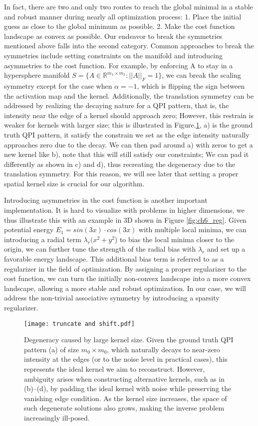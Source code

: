 In fact, there are two and only two routes to reach the global minimal in a stable and robust manner during nearly all optimization process: 1. Place the initial guess as close to the global minimum as possible. 2. Make the cost function landscape as convex as possible. Our endeavor to break the symmetries mentioned above falls into the second category. Common approaches to break the symmetries include setting constraints on the manifold and introducing asymmetries to the cost function. For example, by enforcing A to stay in a hypersphere manifold $S = \{A \in \mathbb{R}^{m_1 \times m_2}: \vert\vert A \vert \vert_{F}= 1\}$, we can break the scaling symmetry except for the case when $\alpha = -1$, which is flipping the sign between the activation map and the kernel. Additionally, the translation symmetry can be addressed by realizing the decaying nature for a QPI pattern, that is, the intensity near the edge of a kernel should approach zero; However, this restrain is weaker for kernels with larger size; this is illustrated in Figure.\ref{fig:ch6_t&s}, a) is the ground truth QPI pattern, it satisfy the constrain we set as the edge intensity naturally approaches zero due to the decay. We can then pad around a) with zeros to get a new kernel like b), note that this will still satisfy our constraints; We can pad it differently as shown in c) and d), thus recreating the degeneracy due to the translation symmetry. For this reason, we will see later that setting a proper spatial kernel size is crucial for our algorithm. 

Introducing asymmetries in the cost function is another important implementation. It is hard to visualize with problems in higher dimensions, we thus illustrate this with an example in 3D shown in Figure \ref{fig:ch6_reg}. Given potential energy $E_1 = sin(3x)\cdot cos(3x)$ with multiple local minima, we can introducing a radial term $\lambda_r(x^2 + y^2$) to bias the local minima closer to the origin, we can further tune the strength of the radial bias with $\lambda_r$ and set up a favorable energy landscape. This additional bias term is referred to as a regularizer in the field of optimization. By assigning a proper regularizer to the cost function, we can turn the initially non-convex landscape into a more convex landscape, allowing a more stable and robust optimization. In our case, we will address the non-trivial associative symmetry by introducing a sparsity regularizer. 

\begin{figure}
	\texttt{[image: truncate and shift.pdf]} 
	\centering
	\caption{Degeneracy caused by large kernel size. Given the ground truth QPI pattern (a) of size $m_0 \times m_0$, which naturally decays to near-zero intensity at the edges (or to the noise level in practical cases), this represents the ideal kernel we aim to reconstruct. However, ambiguity arises when constructing alternative kernels, such as in (b)–(d), by padding the ideal kernel with noise while preserving the vanishing edge condition. As the kernel size increases, the space of such degenerate solutions also grows, making the inverse problem increasingly ill-posed.}
	\label{fig:ch6_t&s}
\end{figure}

